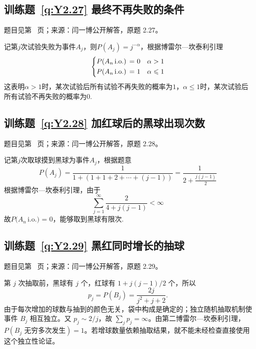 \documentclass[UTF8,12pt,a4paper,fontset=fandol]{ctexbook}
\begin{document}
\subsection*{训练题~\ref{q:Y2.27} 最终不再失败的条件}\label{a:Y2.27}{\small 题目见第~\pageref{q:Y2.27} 页；来源：闫一博公开解答，原题 2.27。}
\begin{solve}
记第$j$次试验失败为事件$A_j$，则$P(A_j)=j^{-\alpha}$，根据博雷尔—坎泰利引理
\[\left\{ \begin{gathered}
  P({A_n}\,{\text{i}}.{\text{o}}{\text{.) = 0}} \hfill \quad \alpha>1 \\
  P({A_n}\,{\text{i}}.{\text{o}}{\text{.) = 1}} \hfill \quad \alpha\leqslant 1\\ 
\end{gathered}  \right.\]
这表明$\alpha>1$时，某次试验后所有试验不再失败的概率为$1$，$\alpha\leqslant 1$时，某次试验后所有试验不再失败的概率为$0$.
\end{solve}

\subsection*{训练题~\ref{q:Y2.28} 加红球后的黑球出现次数}\label{a:Y2.28}{\small 题目见第~\pageref{q:Y2.28} 页；来源：闫一博公开解答，原题 2.28。}
\begin{solve}
记第$j$次取球摸到黑球为事件$A_j$，根据题意
\[P({A_j}) = \frac{1}{{1 + (1 + 1 + 2 +  \cdots  + (j - 1))}} = \frac{1}{{2 + \frac{{j(j - 1)}}{2}}}\]
根据博雷尔—坎泰利引理，由于
\[\sum\limits_{j = 1}^\infty  {\frac{2}{{4 + j(j - 1)}}}  < \infty \]
故$P({A_n}\,{\text{i}}.{\text{o}}{\text{.) = 0}}$，能够取到黑球有限次.
\end{solve}

\subsection*{训练题~\ref{q:Y2.29} 黑红同时增长的抽球}\label{a:Y2.29}{\small 题目见第~\pageref{q:Y2.29} 页；来源：闫一博公开解答，原题 2.29。}
\begin{solve}第 $j$ 次抽取前，黑球有 $j$ 个，红球有 $1+j(j-1)/2$ 个，所以\[p_j=P(B_j)=\frac{2j}{j^2+j+2}.\]由于每次增加的球数与抽到的颜色无关，袋中构成是确定的；独立随机抽取机制使事件 $B_j$ 相互独立。又 $p_j\sim2/j$，故 $\sum_jp_j=\infty$。由第二博雷尔—坎泰利引理，$P(B_j\text{ 无穷多次发生})=1$。若增球数量依赖抽取结果，就不能未经检查直接使用这个独立性论证。\end{solve}
\end{document}
